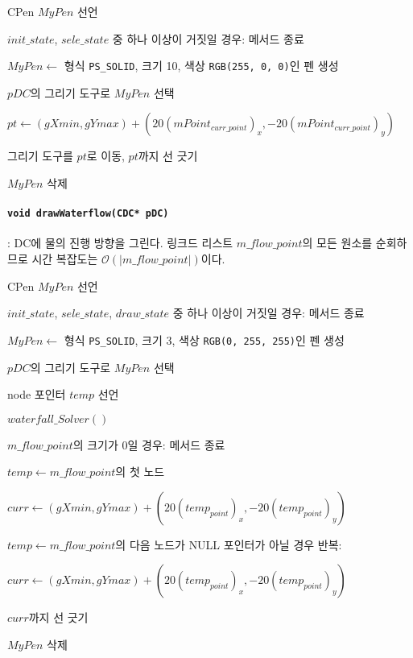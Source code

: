\begin{algorithm}
	\item CPen $MyPen$ 선언
	\item $init\_state$, $sele\_state$ 중 하나 이상이 거짓일 경우: 메서드 종료
	\item $MyPen \leftarrow $ 형식 \texttt{PS_SOLID}, 크기 10, 색상 \texttt{RGB(255, 0, 0)}인 펜 생성
	\item $pDC$의 그리기 도구로 $MyPen$ 선택
	\item $pt \leftarrow \left(gXmin, gYmax\right) + \left(20\left(mPoint_{curr\_point}\right)_x, -20\left(mPoint_{curr\_point}\right)_y\right)$
	\item 그리기 도구를 $pt$로 이동, $pt$까지 선 긋기
	\item $MyPen$ 삭제
\end{algorithm}

\paragraph{\texttt{void drawWaterflow(CDC* pDC)}}: DC에 물의 진행 방향을 그린다. 링크드 리스트
$m\_flow\_point$의 모든 원소를 순회하므로 시간 복잡도는 $\mathcal{O}\left(\left|m\_flow\_point\right|\right)$이다.

\begin{algorithm}
	\item CPen $MyPen$ 선언
	\item $init\_state$, $sele\_state$, $draw\_state$ 중 하나 이상이 거짓일 경우: 메서드 종료
	\item $MyPen \leftarrow $ 형식 \texttt{PS_SOLID}, 크기 3, 색상 \texttt{RGB(0, 255, 255)}인 펜 생성
	\item $pDC$의 그리기 도구로 $MyPen$ 선택
	\item node 포인터 $temp$ 선언
	\item $waterfall\_Solver()$
	\item $m\_flow\_point$의 크기가 0일 경우: 메서드 종료
	\item $temp \leftarrow m\_flow\_point$의 첫 노드
	\item $curr \leftarrow \left(gXmin, gYmax\right) + \left(20\left(temp_{point}\right)_x, -20\left(temp_{point}\right)_y\right)$
	\item $temp \leftarrow m\_flow\_point$의 다음 노드가 NULL 포인터가 아닐 경우 반복:
	\begin{algorithm}
		\item $curr \leftarrow \left(gXmin, gYmax\right) + \left(20\left(temp_{point}\right)_x, -20\left(temp_{point}\right)_y\right)$
		\item $curr$까지 선 긋기
	\end{algorithm}
	\item $MyPen$ 삭제
\end{algorithm}

